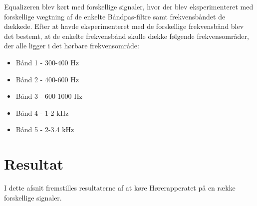 Equalizeren blev kørt med forskellige signaler, hvor der blev eksperimenteret med forskellige vægtning af de enkelte Båndpas-filtre samt frekvensbåndet de dækkede. Efter at havde eksperimenteret med de forskellige frekvensbånd blev det bestemt, at de enkelte frekvensbånd skulle dække følgende frekvensområder, der alle ligger i det hørbare frekvensområde:
\begin{itemize}
	\item Bånd 1 - 300-400 Hz
	\item Bånd 2 - 400-600 Hz
	\item Bånd 3 - 600-1000 Hz
	\item Bånd 4 - 1-2 kHz
	\item Bånd 5 - 2-3.4 kHz
\end{itemize}

\section{Resultat}
I dette afsnit fremstilles resultaterne af at køre Hørerapperatet på en række forskellige signaler.
